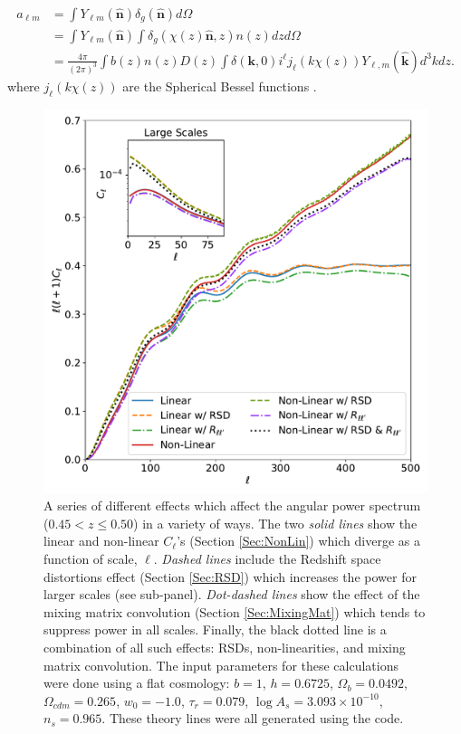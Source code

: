 \begin{align}
a_{\ell m} &= \int Y_{\ell m}(\hat{\textbf{n}}) \delta_g(\hat{\textbf{n}}) d\Omega \\
		&= \int Y_{\ell m}(\hat{\textbf{n}}) \int \delta_g(\chi(z)\hat{\textbf{n}},z) n(z) dz d\Omega \\
        &= \frac{4\pi}{(2\pi)^3} \int b(z)n(z)D(z) \int \delta(\textbf{k},0) i^{\ell} j_{\ell}(k\chi(z)) Y_{{\ell},m}(\hat{\textbf{k}}) d^3k dz.\label{Eq:ThisOne}
\end{align}
where $j_{\ell}(k\chi(z))$ are the Spherical Bessel functions \citep{Thomas2010Neutr, Thomas2011}.

\begin{figure}
\begin{center}
\includegraphics[width=\textwidth]{BOSS-FIGS/Cls-Comparison.pdf}
\caption[Different effects which affect the angular power spectrum modelled into \texttt{UCLCL}.]{A series of different effects which affect the angular power spectrum ($0.45 < z \leq 0.50$) in a variety of ways. The two \textit{solid lines} show the linear and non-linear $C_{\ell}$'s (Section \ref{Sec:NonLin}) which diverge as a function of scale, $\ell$. \textit{Dashed lines} include the Redshift space distortions effect (Section \ref{Sec:RSD}) which increases the power for larger scales (see sub-panel). \textit{Dot-dashed lines} show the effect of the mixing matrix convolution (Section \ref{Sec:MixingMat}) which tends to suppress power in all scales. Finally, the black dotted line is a combination of all such effects: RSDs, non-linearities, and mixing matrix convolution. The input parameters for these calculations were done using a flat cosmology: $b=1$, $h = 0.6725$, $\Omega_b = 0.0492$, $\Omega_{cdm} = 0.265$, $w_0=-1.0$, $\tau_r = 0.079$, $\log A_s = 3.093 \times 10^{-10}$, $n_s = 0.965$. These theory lines were all generated using the \uclcl code.}
\label{fig:Cl_Theory}
\end{center}
\end{figure}

